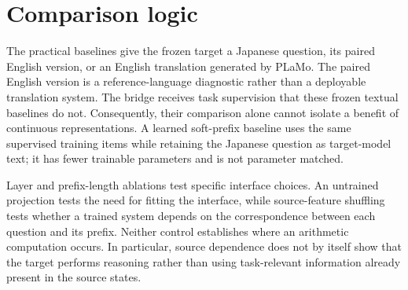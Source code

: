 \section{Comparison logic}

The practical baselines give the frozen target a Japanese question, its paired English version, or an English translation generated by PLaMo.
The paired English version is a reference-language diagnostic rather than a deployable translation system.
The bridge receives task supervision that these frozen textual baselines do not.
Consequently, their comparison alone cannot isolate a benefit of continuous representations.
A learned soft-prefix baseline uses the same supervised training items while retaining the Japanese question as target-model text; it has fewer trainable parameters and is not parameter matched.

Layer and prefix-length ablations test specific interface choices.
An untrained projection tests the need for fitting the interface, while source-feature shuffling tests whether a trained system depends on the correspondence between each question and its prefix.
Neither control establishes where an arithmetic computation occurs.
In particular, source dependence does not by itself show that the target performs reasoning rather than using task-relevant information already present in the source states.
